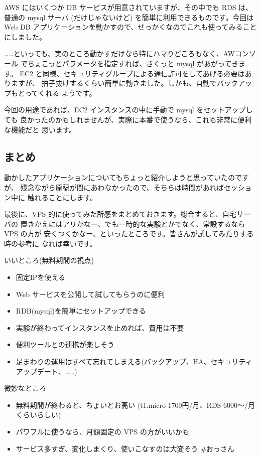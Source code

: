 \documentclass[mingoth,a4paper]{jsarticle}
\begin{document}
AWS にはいくつか DB サービスが用意されていますが、その中でも RDS は、普通の
mysql サーバ (だけじゃないけど) を簡単に利用できるものです。今回は Web DB
アプリケーションを動かすので、せっかくなのでこれも使ってみることにしました。

……といっても、実のところ動かすだけなら特にハマりどころもなく、AWコンソール
でちょこっとパラメータを指定すれば、さくっと mysql があがってきます。
EC2 と同様、セキュリティグループによる通信許可をしてあげる必要はありますが、
拍子抜けするくらい簡単に動きました。しかも、自動でバックアップもとってくれる
ようです。

今回の用途であれば、EC2 インスタンスの中に手動で mysql をセットアップしても
良かったのかもしれませんが、実際に本番で使うなら、これも非常に便利な機能だと
思います。

\subsection{まとめ}

動かしたアプリケーションについてもちょっと紹介しようと思っていたのですが、
残念ながら原稿が間にあわなかったので、そちらは時間があればセッション中に
触れることにします。

最後に、VPS 的に使ってみた所感をまとめておきます。総合すると、自宅サーバの
置きかえにはアリかなー、でも一時的な実験とかでなく、常設するなら VPS の方が
安くつくかなー、といったところです。皆さんが試してみたりする時の参考に
なれば幸いです。

\begin{description}
\item いいところ(無料期間の視点)
  \begin{itemize}
  \item 固定IPを使える
  \item Web サービスを公開して試してもらうのに便利
  \item RDB(mysql)を簡単にセットアップできる
  \item 実験が終わってインスタンスを止めれば、費用は不要
  \item 便利ツールとの連携が楽しそう
  \item 足まわりの運用はすべて忘れてしまえる(バックアップ、HA、セキュリティアップデート、……)
  \end{itemize}
\item 微妙なところ
  \begin{itemize}
  \item 無料期間が終わると、ちょいとお高い (t1.micro 1700円/月、RDS 6000〜/月くらいらしい)
  \item パワフルに使うなら、月額固定の VPS の方がいいかも
  \item サービス多すぎ、変化しまくり、使いこなすのは大変そう \#おっさん
  \end{itemize}
\end{description}
\end{document}
